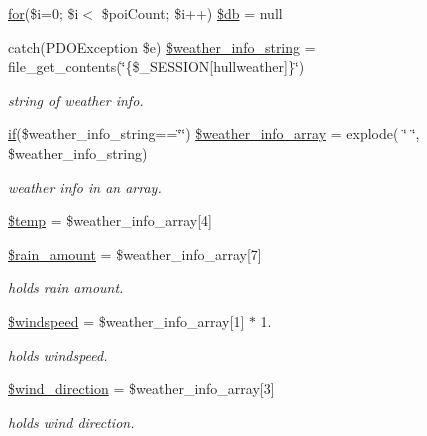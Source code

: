 \begin{DoxyCompactItemize}
\mbox{\hyperlink{index_8php_aa11bce3c9d33806cade344b0536e0508}{for}}(\$i=0; \$i$<$ \$poi\+Count; \$i++) \mbox{\hyperlink{hull_2index_8php_ae26e87d17180fc87313d19b439092f0f}{\$db}} = null
\item 
catch(P\+D\+O\+Exception \$e) \mbox{\hyperlink{hull_2index_8php_aa85edc6c515eee98e2848667893e007d}{\$weather\+\_\+info\+\_\+string}} = file\+\_\+get\+\_\+contents(\char`\"{}\{\$\+\_\+\+S\+E\+S\+S\+I\+ON\mbox{[}\textquotesingle{}hullweather\textquotesingle{}\mbox{]}\}\char`\"{})
\begin{DoxyCompactList}\small\item\em string of weather info. \end{DoxyCompactList}\item 
\mbox{\hyperlink{hull_2index_8php_a8f0d8893361d6307986497540738a8bf}{if}}(\$weather\+\_\+info\+\_\+string==\char`\"{}\char`\"{}) \mbox{\hyperlink{hull_2index_8php_a16271cc4158d1822fa59adaf196eb3d4}{\$weather\+\_\+info\+\_\+array}} = explode( \char`\"{} \char`\"{}, \$weather\+\_\+info\+\_\+string)
\begin{DoxyCompactList}\small\item\em weather info in an array. \end{DoxyCompactList}\item 
\mbox{\hyperlink{hull_2index_8php_a0d57fb0317e19ec798aa625381ebf342}{\$temp}} = \$weather\+\_\+info\+\_\+array\mbox{[}4\mbox{]}
\item 
\mbox{\hyperlink{hull_2index_8php_a2aa7fd45b683a3c60b6f5e5d11a027b3}{\$rain\+\_\+amount}} = \$weather\+\_\+info\+\_\+array\mbox{[}7\mbox{]}
\begin{DoxyCompactList}\small\item\em holds rain amount. \end{DoxyCompactList}\item 
\mbox{\hyperlink{hull_2index_8php_a98bffc039f434ba80b316614e0fc94db}{\$windspeed}} = \$weather\+\_\+info\+\_\+array\mbox{[}1\mbox{]} $\ast$ 1.
\begin{DoxyCompactList}\small\item\em holds windspeed. \end{DoxyCompactList}\item 
\mbox{\hyperlink{hull_2index_8php_acae9d7e1905e3a01e07d87856885aa2c}{\$wind\+\_\+direction}} = \$weather\+\_\+info\+\_\+array\mbox{[}3\mbox{]}
\begin{DoxyCompactList}\small\item\em holds wind direction. \end{DoxyCompactList}\item 

\end{DoxyCompactItemize}
